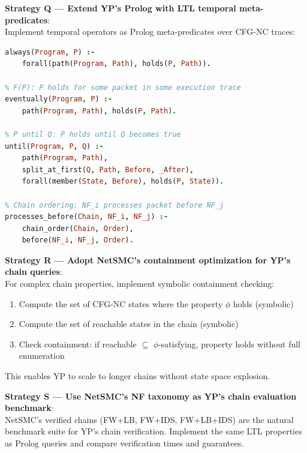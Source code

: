 \begin{strategybox}
\textbf{Strategy Q --- Extend YP's Prolog with LTL temporal meta-predicates}:\\
Implement temporal operators as Prolog meta-predicates over CFG-NC traces:
\begin{lstlisting}[language=Prolog]
% G(P): P holds for all packets in all execution traces
always(Program, P) :-
    forall(path(Program, Path), holds(P, Path)).

% F(P): P holds for some packet in some execution trace  
eventually(Program, P) :-
    path(Program, Path), holds(P, Path).

% P until Q: P holds until Q becomes true
until(Program, P, Q) :-
    path(Program, Path),
    split_at_first(Q, Path, Before, _After),
    forall(member(State, Before), holds(P, State)).

% Chain ordering: NF_i processes packet before NF_j
processes_before(Chain, NF_i, NF_j) :-
    chain_order(Chain, Order),
    before(NF_i, NF_j, Order).
\end{lstlisting}

\textbf{Strategy R --- Adopt NetSMC's containment optimization for YP's chain queries}:\\
For complex chain properties, implement symbolic containment checking:
\begin{enumerate}
  \item Compute the set of CFG-NC states where the property $\phi$ holds (symbolic)
  \item Compute the set of reachable states in the chain (symbolic)
  \item Check containment: if reachable $\subseteq$ $\phi$-satisfying, property holds without full enumeration
\end{enumerate}
This enables YP to scale to longer chains without state space explosion.

\textbf{Strategy S --- Use NetSMC's NF taxonomy as YP's chain evaluation benchmark}:\\
NetSMC's verified chains (FW+LB, FW+IDS, FW+LB+IDS) are the natural benchmark suite for YP's chain verification. Implement the same LTL properties as Prolog queries and compare verification times and guarantees.
\end{strategybox}

